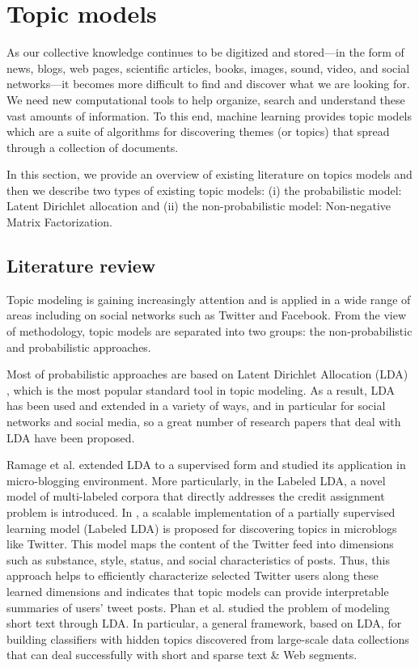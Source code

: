 \section{Topic models}

As our collective knowledge continues to be digitized and stored—in the 
form of news, blogs, web pages, scientific articles, books, images, sound,
video, and social networks—it becomes more difficult to find and discover 
what we are looking for. We need new computational tools to help organize, 
search and understand these vast amounts of information. To this end, machine learning provides topic models which are a suite of algorithms for discovering themes (or topics) that spread through a collection of documents.

In this section, we provide an overview of existing literature on topics models and then we describe two types of existing topic models: (i) the probabilistic model: Latent Dirichlet allocation and (ii) the non-probabilistic model: Non-negative Matrix Factorization.



\subsection{Literature review}

Topic modeling is gaining increasingly attention and is applied in a wide range of areas including on social networks such as Twitter and Facebook. From the view of methodology, topic models are separated into two groups: the non-probabilistic and probabilistic approaches. 


Most of probabilistic approaches are based on Latent Dirichlet Allocation (LDA) \cite{Blei}, which is the most popular standard tool in topic modeling. As a result, LDA has been used and extended in a variety of ways, and in particular 
for social networks and social media, so a great number of research papers that deal with LDA have been proposed.


Ramage et al. \cite{microblogs,Ramage} extended LDA to a supervised form and studied its application in
micro-blogging environment. More particularly, in \cite{Ramage} the Labeled LDA, a novel model of
multi-labeled corpora that directly addresses the credit assignment problem is introduced. In \cite{microblogs},
a scalable implementation of a partially supervised learning model (Labeled LDA) is proposed for 
discovering topics in microblogs like Twitter. This model maps the content of the Twitter feed 
into dimensions such as substance, style, status, and social characteristics of posts. Thus, this approach 
helps to efficiently characterize selected Twitter users along these learned dimensions and indicates that 
topic models can provide interpretable summaries of users’ tweet posts. Phan et al. \cite{Phan} studied the problem
of modeling short text through LDA. In particular, a general framework, based on LDA, for building classifiers 
with hidden topics discovered from large-scale data collections that can deal successfully with short and
sparse text & Web segments. 

